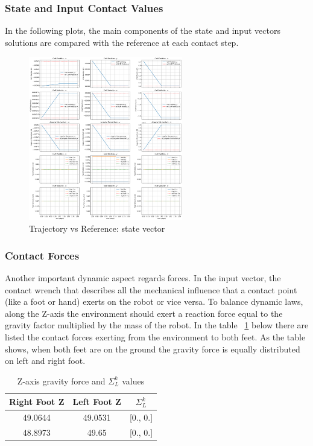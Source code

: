 \documentclass[main.tex]{subfiles}
\begin{document}
\subsubsection{State and Input Contact Values}
In the following plots, the main components of the state and input vectors solutions are compared with the reference at each contact step.
\begin{figure}[htbp]
    \centering
    \includegraphics[width=0.6\textwidth]{figures/contact_x_still.png}
    \caption{Trajectory vs Reference: state vector}
    \label{fig:contact_x_still}
\end{figure}

\subsubsection{Contact Forces}
Another important dynamic aspect regards forces. 
In the input vector, the contact wrench that describes all the mechanical influence that a contact point (like a foot or hand) exerts on the robot or vice versa.
To balance dynamic laws, along the Z-axis the environment should exert a reaction force equal to the gravity factor multiplied by the mass of the robot. In the table ~\ref{tab:contact_forces_still}  below there are listed the contact forces exerting from the environment to both feet. As the table shows, when both feet are on the ground the gravity force is equally distributed on left and right foot.
\begin{table}[H]
\label{tab:contact_forces_still}
\centering
\begin{tabular}{ccc}
\toprule
Right Foot Z & Left Foot Z & $\Sigma_L^k$ \\
\midrule
49.0644 & 49.0531 & [0., 0.] \\
48.8973 & 49.65 & [0., 0.] \\
\bottomrule
\end{tabular}
\caption{Z-axis gravity force and $\Sigma_L^k$ values}
\end{table}
\end{document}
